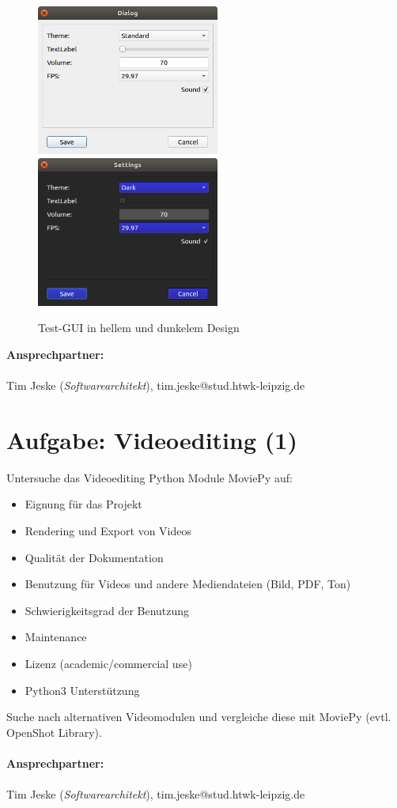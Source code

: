 \documentclass{article}
\begin{document}
\begin{figure}[H]
    \centering
    \includegraphics[width=6cm]{technologierecherche/TestGui-light.png}\hspace{1cm}
    \includegraphics[width=6cm]{technologierecherche/TestGui-dark.png}
    \caption{Test-GUI in hellem und dunkelem Design}
    \label{fig:my_label}
\end{figure}
\textbf{Ansprechpartner:}
\\\\
Tim Jeske (\emph{Softwarearchitekt}), tim.jeske@stud.htwk-leipzig.de

\newpage

\section{Aufgabe: Videoediting (1)}
Untersuche das Videoediting Python Module MoviePy auf:
\begin{itemize}
    \item Eignung für das Projekt
    \item Rendering und Export von Videos
    \item Qualität der Dokumentation
    \item Benutzung für Videos und andere Mediendateien (Bild, PDF, Ton)
    \item Schwierigkeitsgrad der Benutzung
    \item Maintenance
    \item Lizenz (academic/commercial use)
    \item Python3 Unterstützung
\end{itemize}
Suche nach alternativen Videomodulen und vergleiche diese mit MoviePy (evtl. OpenShot Library).
\\\\
\textbf{Ansprechpartner:}
\\\\
Tim Jeske (\emph{Softwarearchitekt}), tim.jeske@stud.htwk-leipzig.de
\end{document}
